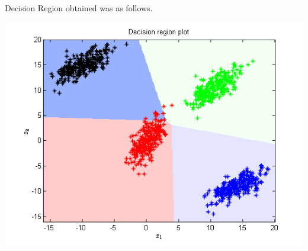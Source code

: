 \documentclass{article}
\begin{document}
Decision Region obtained was as follows.
\begin{center}
\includegraphics[scale=0.9]{Classification/1a/c_linear/dec}
\end{center}
\end{document}
